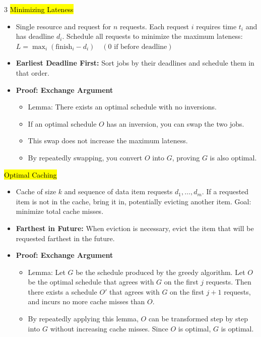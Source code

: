 \documentclass[letterpaper]{article}
\begin{document}
\begin{multicols*}{3}
    \hl{Minimizing Lateness}
    \begin{itemize}
        \item Single resource and request for $n$ requests. Each request $i$ requires time $t_i$ and has deadline $d_i$. Schedule all requests to minimize the maximum lateness:
              $
                  L = \max_i (\text{finish}_i - d_i) \quad (\text{0 if before deadline})
              $
        \item \textbf{Earliest Deadline First:} Sort jobs by their deadlines and schedule them in that order.
        \item \textbf{Proof: Exchange Argument}
              \begin{itemize}
                  \item Lemma: There exists an optimal schedule with no inversions.
                  \item If an optimal schedule $O$ has an inversion, you can swap the two jobs.
                  \item This swap does not increase the maximum lateness.
                  \item By repeatedly swapping, you convert $O$ into $G$, proving $G$ is also optimal.
              \end{itemize}
    \end{itemize}

    \hl{Optimal Caching}
    \begin{itemize}
        \item Cache of size $k$ and sequence of data item requests $d_1,\dots,d_m$. If a requested item is not in the cache, bring it in, potentially evicting another item. Goal: minimize total cache misses.
        \item \textbf{Farthest in Future:} When eviction is necessary, evict the item that will be requested farthest in the future.
        \item \textbf{Proof: Exchange Argument}
              \begin{itemize}
                  \item Lemma: Let $G$ be the schedule produced by the greedy algorithm. Let $O$ be the optimal schedule that agrees with $G$ on the first $j$ requests. Then there exists a schedule $O'$ that agrees with $G$ on the first $j+1$ requests, and incurs no more cache misses than $O$.
                  \item By repeatedly applying this lemma, $O$ can be transformed step by step into $G$ without increasing cache misses. Since $O$ is optimal, $G$ is optimal.
              \end{itemize}
    \end{itemize}


\end{multicols*}
\end{document}

